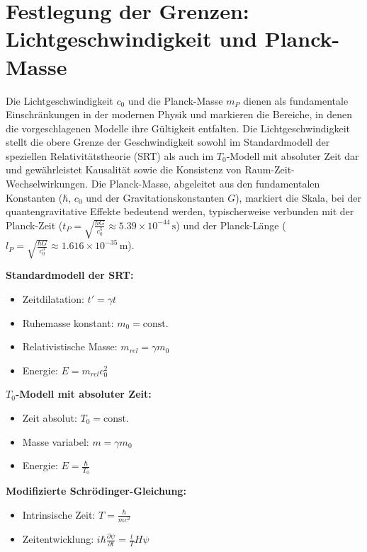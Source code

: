 \documentclass[a4paper,12pt]{article}
\begin{document}
	\section{Festlegung der Grenzen: Lichtgeschwindigkeit und Planck-Masse}
	Die Lichtgeschwindigkeit \( c_0 \) und die Planck-Masse \( m_P \) dienen als fundamentale Einschränkungen in der modernen Physik und markieren die Bereiche, in denen die vorgeschlagenen Modelle ihre Gültigkeit entfalten. Die Lichtgeschwindigkeit stellt die obere Grenze der Geschwindigkeit sowohl im Standardmodell der speziellen Relativitätstheorie (SRT) als auch im \( T_0 \)-Modell mit absoluter Zeit dar und gewährleistet Kausalität sowie die Konsistenz von Raum-Zeit-Wechselwirkungen. Die Planck-Masse, abgeleitet aus den fundamentalen Konstanten (\( \hbar \), \( c_0 \) und der Gravitationskonstanten \( G \)), markiert die Skala, bei der quantengravitative Effekte bedeutend werden, typischerweise verbunden mit der Planck-Zeit (\( t_P = \sqrt{\frac{\hbar G}{c_0^5}} \approx 5.39 \times 10^{-44} \, \text{s} \)) und der Planck-Länge (\( l_P = \sqrt{\frac{\hbar G}{c_0^3}} \approx 1.616 \times 10^{-35} \, \text{m} \)).
	
	\begin{tcolorbox}[colback=blue!5!white,colframe=blue!75!black,title=Definitionen der Modelle]
		\textbf{Standardmodell der SRT:}
		\begin{itemize}
			\item Zeitdilatation: $t' = \gamma t$
			\item Ruhemasse konstant: $m_0 = \text{const.}$
			\item Relativistische Masse: $m_{rel} = \gamma m_0$
			\item Energie: $E = m_{rel}c_0^2$
		\end{itemize}
		
		\textbf{$T_0$-Modell mit absoluter Zeit:}
		\begin{itemize}
			\item Zeit absolut: $T_0 = \text{const.}$
			\item Masse variabel: $m = \gamma m_0$
			\item Energie: $E = \frac{\hbar}{T_0}$
		\end{itemize}
		
		\textbf{Modifizierte Schrödinger-Gleichung:}
		\begin{itemize}
			\item Intrinsische Zeit: $T = \frac{\hbar}{mc^2}$
			\item Zeitentwicklung: $i\hbar\frac{\partial\psi}{\partial t} = \frac{t}{T}H\psi$
		\end{itemize}
	\end{tcolorbox}
	
\end{document}
